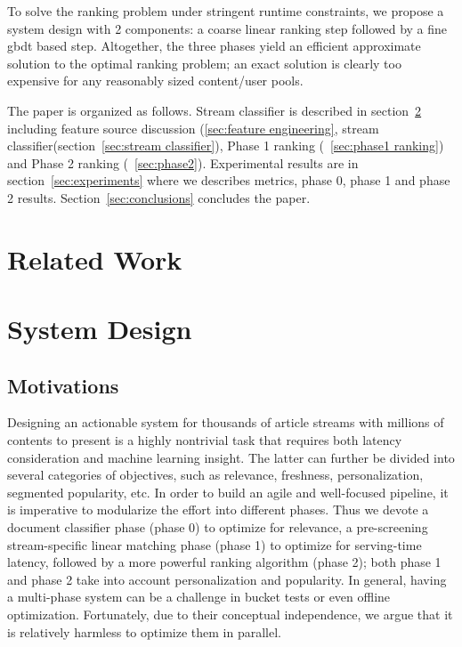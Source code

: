 \documentclass{sig-alternate}
\begin{document}
To solve the ranking problem under stringent runtime constraints, we propose a 
system design with 2 components: a coarse linear ranking step followed by a 
fine gbdt based step. 
Altogether, the three phases yield an efficient approximate solution to the optimal ranking problem; an exact solution is clearly too expensive for any reasonably sized content/user pools.

The paper is organized as follows. Stream classifier is described in 
section~\ref{sec:system design} including feature source discussion 
(\ref{sec:feature engineering}, stream classifier(section~\ref{sec:stream 
classifier}), Phase 1 ranking (~\ref{sec:phase1 ranking}) and Phase 2 ranking 
(~\ref{sec:phase2}). Experimental results are in section~\ref{sec:experiments} 
where we describes metrics, phase 0, phase 1 and phase 2 results. 
Section~\ref{sec:conclusions} concludes the paper.



\section{Related Work}


\section{System Design}
\label{sec:system design}

\subsection{Motivations}
Designing an actionable system for thousands of article streams with millions 
of contents to present is a highly nontrivial task that requires both latency 
consideration and machine learning insight. The latter can further be divided 
into several categories of objectives, such as relevance, freshness, 
personalization, segmented popularity, etc. In order to build an agile and 
well-focused pipeline, it is imperative to modularize the effort into 
different phases. Thus we devote a document classifier phase (phase 0) to 
optimize for relevance, a pre-screening stream-specific linear matching phase 
(phase 1) to optimize for serving-time latency, followed by a more powerful 
ranking algorithm (phase 2); both phase 1 and phase 2 take into account 
personalization and popularity.  In general, having a multi-phase system can 
be a challenge in bucket tests or even offline optimization. Fortunately, due 
to their conceptual independence, we argue that it is relatively harmless to 
optimize them in parallel. 
\end{document}
